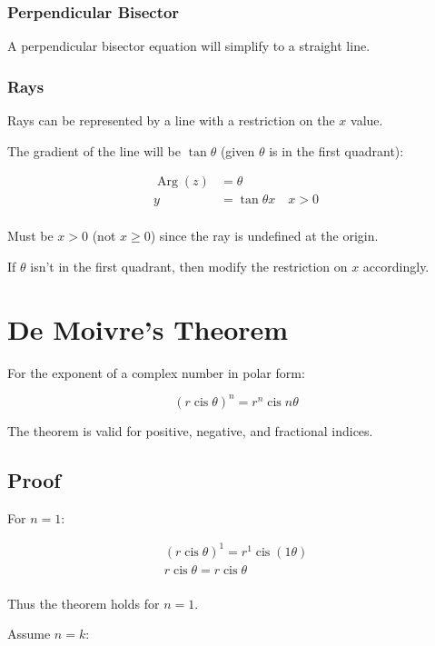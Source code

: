 \documentclass[a4paper,11pt]{report}
\DeclareMathOperator\cis{cis}
\DeclareMathOperator\Arg{Arg}
\begin{document}
\subsubsection{Perpendicular Bisector}

A perpendicular bisector equation will simplify to a straight line.

\subsubsection{Rays}

Rays can be represented by a line with a restriction on the $x$ value.

The gradient of the line will be $\tan{\theta}$ (given $\theta$ is in the first
quadrant):

$$
\begin{aligned}
\Arg(z) & = \theta \\
y & = \tan{\theta} x \quad x > 0 \\
\end{aligned}
$$

Must be $x > 0$ (not $x \geq 0$) since the ray is undefined at the origin.

If $\theta$ isn't in the first quadrant, then modify the restriction on $x$
accordingly.


\section{De Moivre's Theorem}

For the exponent of a complex number in polar form:

$$
(r \cis{\theta})^n = r^n \cis{n \theta}
$$

The theorem is valid for positive, negative, and fractional indices.

\subsection{Proof}

For $n = 1$:

$$
\begin{aligned}
(r \cis{\theta})^1 = r^1 \cis(1 \theta) \\
r \cis{\theta} = r \cis{\theta} \\
\end{aligned}
$$

Thus the theorem holds for $n = 1$.

Assume $n = k$:
\end{document}

